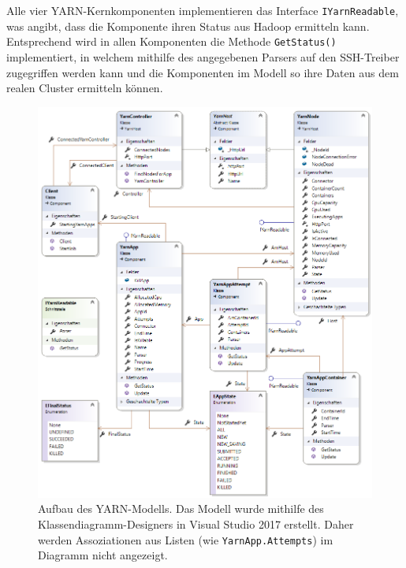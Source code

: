 Alle vier YARN-Kernkomponenten implementieren das Interface \texttt{IYarnReadable}, was angibt, dass die Komponente ihren Status aus Hadoop ermitteln kann. Entsprechend wird in allen Komponenten die Methode \texttt{GetStatus()} implementiert, in welchem mithilfe des angegebenen Parsers auf den SSH-Treiber zugegriffen werden kann und die Komponenten im Modell so ihre Daten aus dem realen Cluster ermitteln können.

\begin{figure}
    \centering
    \includegraphics[width=\columnwidth]{./images/yarnModel.png}
    \caption[Aufbau des YARN-Modells]{Aufbau des YARN-Modells. Das Modell wurde mithilfe des Klassendiagramm-Designers in Visual Studio 2017 erstellt. Daher werden Assoziationen aus Listen (wie \texttt{YarnApp.Attempts}) im Diagramm nicht angezeigt.}
    \label{fig:yarnModel}
\end{figure}
